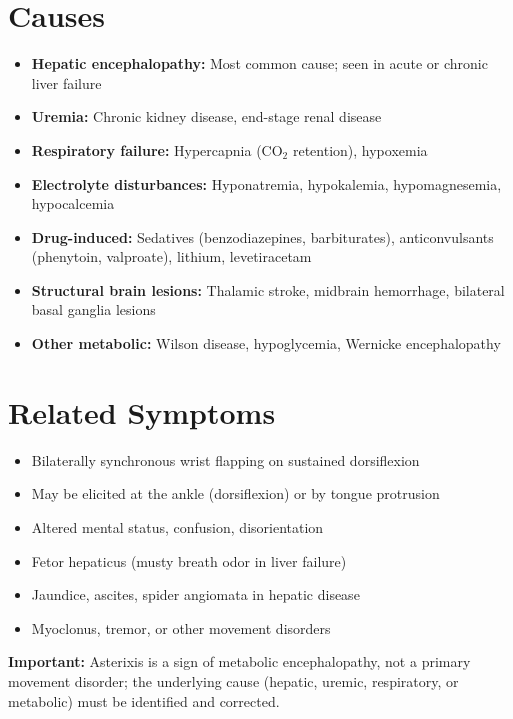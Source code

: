 \section*{Causes}
\begin{itemize}
 \item \textbf{Hepatic encephalopathy:} Most common cause; seen in acute or chronic liver failure
 \item \textbf{Uremia:} Chronic kidney disease, end-stage renal disease
 \item \textbf{Respiratory failure:} Hypercapnia (CO$_2$ retention), hypoxemia
 \item \textbf{Electrolyte disturbances:} Hyponatremia, hypokalemia, hypomagnesemia, hypocalcemia
 \item \textbf{Drug-induced:} Sedatives (benzodiazepines, barbiturates), anticonvulsants (phenytoin, valproate), lithium, levetiracetam
 \item \textbf{Structural brain lesions:} Thalamic stroke, midbrain hemorrhage, bilateral basal ganglia lesions
 \item \textbf{Other metabolic:} Wilson disease, hypoglycemia, Wernicke encephalopathy
\end{itemize}

\section*{Related Symptoms}
\begin{itemize}
 \item Bilaterally synchronous wrist flapping on sustained dorsiflexion
 \item May be elicited at the ankle (dorsiflexion) or by tongue protrusion
 \item Altered mental status, confusion, disorientation
 \item Fetor hepaticus (musty breath odor in liver failure)
 \item Jaundice, ascites, spider angiomata in hepatic disease
 \item Myoclonus, tremor, or other movement disorders
\end{itemize}
\textbf{Important:} Asterixis is a sign of metabolic encephalopathy, not a primary movement disorder; the underlying cause (hepatic, uremic, respiratory, or metabolic) must be identified and corrected.

